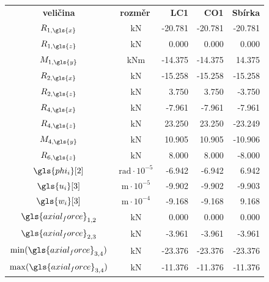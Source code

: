 \begin{table}[H]
    \setlength{\tabcolsep}{10pt}
    \renewcommand{\arraystretch}{1.2}
    \begin{tabular}{ccrrr}
        \rowcolor{ctulightblue} \bfseries veličina & \bfseries rozměr & \bfseries LC1 & \bfseries CO1 & \bfseries Sbírka \\ 
            $R_{1,\gls{x}}$ & $\SI{}{\kilo\newton}$ & -20.781 & -20.781 & -20.781 \\
            $R_{1,\gls{z}}$ & $\SI{}{\kilo\newton}$ &   0.000 &   0.000 &   0.000 \\
            \rowcolor{yellow!15}$M_{1,\gls{y}}$ & $\SI{}{\kilo\newton\metre}$ & -14.375 & -14.375 &  14.375 \\
            $R_{2,\gls{x}}$ & $\SI{}{\kilo\newton}$ & -15.258 & -15.258 & -15.258 \\
            \rowcolor{yellow!15}$R_{2,\gls{z}}$ & $\SI{}{\kilo\newton}$ &   3.750 &   3.750 &   -3.750 \\
            $R_{4,\gls{x}}$ & $\SI{}{\kilo\newton}$ &  -7.961 &  -7.961 &  -7.961 \\
            \rowcolor{yellow!15}$R_{4,\gls{z}}$ & $\SI{}{\kilo\newton}$ &  23.250 &  23.250 &  -23.249 \\
            \rowcolor{yellow!15}$M_{4,\gls{y}}$ & $\SI{}{\kilo\newton}$ &  10.905 &  10.905 &  -10.906 \\
            \rowcolor{yellow!15}$R_{6,\gls{z}}$ & $\SI{}{\kilo\newton}$ &   8.000 &   8.000 &  -8.000 \\
            $\gls{phi_i}[2]$ & $\SI{}{\radian}\cdot 10^{-5}$ & -6.942 & -6.942 & 6.942 \\
            \rowcolor{red!8}$\gls{u_i}[3]$ & $\SI{}{\metre}\cdot 10^{-5}$ & -9.902 & -9.902 & -9.903 \\
            \rowcolor{yellow!15}$\gls{w_i}[3]$ & $\SI{}{\metre}\cdot 10^{-4}$ & -9.168 & -9.168 & 9.168 \\
            $\gls{axial_force}_{1,2}$ & $\SI{}{\kilo\newton}$ & 0.000 & 0.000 & 0.000 \\
            $\gls{axial_force}_{2,3}$ & $\SI{}{\kilo\newton}$ & -3.961 & -3.961 & -3.961 \\
            $\min(\gls{axial_force}_{3,4})$ & $\SI{}{\kilo\newton}$ & -23.376 & -23.376 & -23.376 \\
            $\max(\gls{axial_force}_{3,4})$ & $\SI{}{\kilo\newton}$ & -11.376 & -11.376 & -11.376 \\

\end{tabular}
\end{table}
